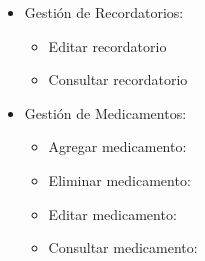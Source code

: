 \begin{itemize}
	\item Gestión de Recordatorios:
	\begin{itemize}
		\item Editar recordatorio
		\item Consultar recordatorio
	\end{itemize}
	
	\item Gestión de Medicamentos:
	\begin{itemize}
		\item Agregar medicamento:
		\item Eliminar medicamento:
		\item Editar medicamento:
		\item Consultar medicamento:
	\end{itemize}
\end{itemize}